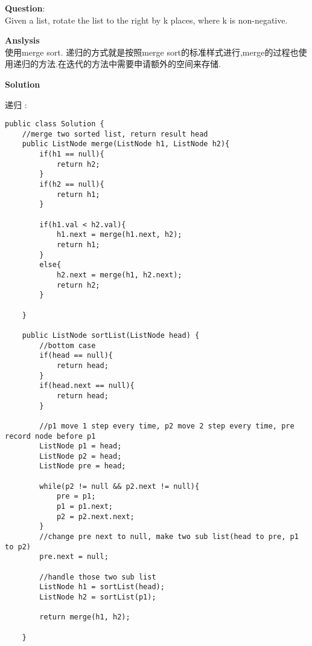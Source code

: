     
\begin{description}
    \item{\textbf{Question}}:\\%
		Given a list, rotate the list to the right by k places, where k is non-negative.

    \item{\textbf{Anslysis}}\\
	使用merge sort. 递归的方式就是按照merge sort的标准样式进行,merge的过程也使用递归的方法.在迭代的方法中需要申请额外的空间来存储.

    \item{\textbf{Solution}}
	\item{递归} : \\
		\begin{lstlisting}
public class Solution {
    //merge two sorted list, return result head
    public ListNode merge(ListNode h1, ListNode h2){
        if(h1 == null){
            return h2;
        }
        if(h2 == null){
            return h1;
        }

        if(h1.val < h2.val){
            h1.next = merge(h1.next, h2);
            return h1;
        }
        else{
            h2.next = merge(h1, h2.next);
            return h2;
        }

    }

    public ListNode sortList(ListNode head) {
        //bottom case
        if(head == null){
            return head;
        }
        if(head.next == null){
            return head;
        }

        //p1 move 1 step every time, p2 move 2 step every time, pre record node before p1
        ListNode p1 = head;
        ListNode p2 = head;
        ListNode pre = head;

        while(p2 != null && p2.next != null){
            pre = p1;
            p1 = p1.next;
            p2 = p2.next.next;
        }
        //change pre next to null, make two sub list(head to pre, p1 to p2)
        pre.next = null;

        //handle those two sub list
        ListNode h1 = sortList(head);
        ListNode h2 = sortList(p1);

        return merge(h1, h2);

    }


\end{lstlisting}
\end{description}
